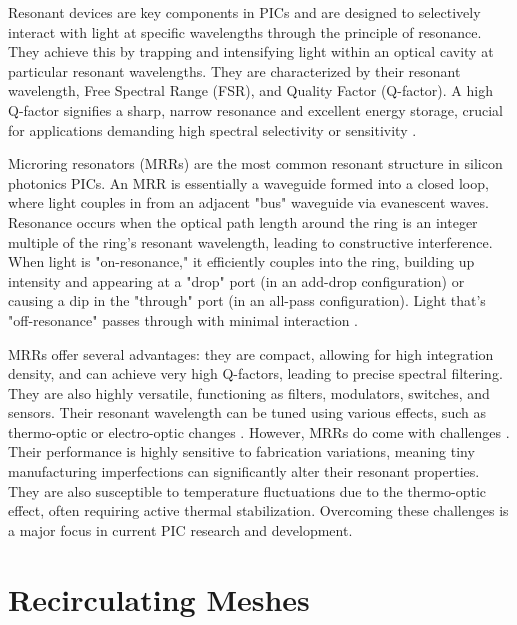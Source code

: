 Resonant devices are key components in PICs and are designed to selectively interact with light at specific wavelengths through the principle of resonance.
They achieve this by trapping and intensifying light within an optical cavity at particular resonant wavelengths.
They are characterized by their resonant wavelength, Free Spectral Range (FSR), and Quality Factor (Q-factor).
A high Q-factor signifies a sharp, narrow resonance and excellent energy storage, crucial for applications demanding high spectral selectivity or sensitivity \cite{bogaerts_silicon_2012}.

Microring resonators (MRRs) are the most common resonant structure in silicon photonics PICs.
An MRR is essentially a waveguide formed into a closed loop, where light couples in from an adjacent "bus" waveguide via evanescent waves.
Resonance occurs when the optical path length around the ring is an integer multiple of the ring's resonant wavelength, leading to constructive interference.
When light is "on-resonance," it efficiently couples into the ring, building up intensity and appearing at a "drop" port (in an add-drop configuration) or causing a dip in the "through" port (in an all-pass configuration).
Light that's "off-resonance" passes through with minimal interaction \cite{chao_polymer_2006}.

MRRs offer several advantages: they are compact, allowing for high integration density, and can achieve very high Q-factors, leading to precise spectral filtering.
They are also highly versatile, functioning as filters, modulators, switches, and sensors.
Their resonant wavelength can be tuned using various effects, such as thermo-optic or electro-optic changes \cite{bawankar_microring_2021}.
However, MRRs do come with challenges \cite{little_toward_2000}.
Their performance is highly sensitive to fabrication variations, meaning tiny manufacturing imperfections can significantly alter their resonant properties.
They are also susceptible to temperature fluctuations due to the thermo-optic effect, often requiring active thermal stabilization.
Overcoming these challenges is a major focus in current PIC research and development.

\section{Recirculating Meshes}\label{sec:recirculating_meshes} %

